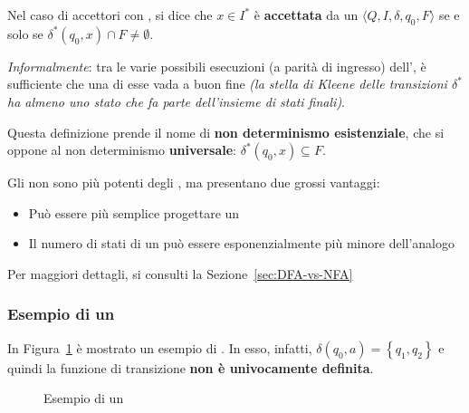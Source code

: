 \documentclass[italian, 10pt]{article}
\begin{document}
\bigskip
Nel caso di \FSA accettori con \ND, si dice che \(x \in I^\ast\) è \textbf{accettata} da un \NFA \(\langle Q, I, \delta, q_0, F \rangle\) se e solo se \(\delta^\ast (q_0, x) \cap F \neq \emptyset\).

\textit{Informalmente}: tra le varie possibili esecuzioni (a parità di ingresso) dell'\NFA, è sufficiente che una di esse vada a buon fine \textit{(la stella di Kleene delle transizioni \(\delta^\ast\) ha almeno uno stato che fa parte dell'insieme di stati finali)}.

Questa definizione prende il nome di \textbf{non determinismo esistenziale}, che si oppone al non determinismo \textbf{universale}: \(\delta^\ast(q_0, x) \subseteq F\).

\bigskip

Gli \NFA non sono più potenti degli \FSA, ma presentano due grossi vantaggi:
\begin{itemize}
  \item Può essere più semplice progettare un \NFA
  \item Il numero di stati di un \NFA può essere esponenzialmente più minore dell'analogo \FSA
\end{itemize}
Per maggiori dettagli, si consulti la Sezione~\ref{sec:DFA-vs-NFA}

\subsubsection{Esempio di un \NFA}

In Figura~\ref{fig:esempio-NFA} è mostrato un esempio di \NFA.
In esso, infatti, \(\delta(q_0, a) = \left\{q_1, q_2\right\}\) e quindi la funzione di transizione \textbf{non è univocamente definita}.

\begin{figure}[htbp]
  \bigskip
  \centering

  \caption{Esempio di un \NFA}
  \label{fig:esempio-NFA}
  \bigskip
\end{figure}
\end{document}

